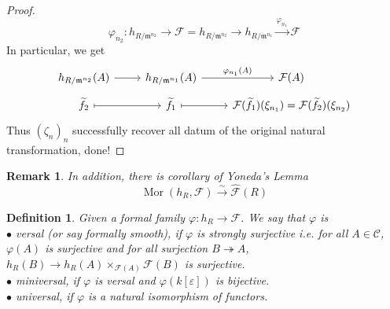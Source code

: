 \documentclass{ctexart}
\newtheorem{definition}{Definition}[section]
\newtheorem{remark}{Remark}[section]
\newcommand{\mor}{\operatorname{Mor}}
\begin{document}
\begin{proof}
    \begin{equation}
        \varphi_{n_{2}}: h_{R/\mathfrak{m}^{n_{2}}} \longrightarrow \mathcal{F} = h_{R/\mathfrak{m}^{n_{2}}} \longrightarrow h_{R/\mathfrak{m}^{n_{1}}} \overset{\varphi_{n_{1}}}{\longrightarrow} \mathcal{F}
    \end{equation} 
    In particular, we get
    \begin{equation}
        \begin{tikzcd}[row sep = tiny]
            h_{R/\mathfrak{m}^{n_{2}}}(A) \arrow[r] &
            h_{R/\mathfrak{m}^{n_{1}}}(A) \arrow[r, "\varphi_{n_{1}}(A)"] &
            \mathcal{F}(A) \\
            \widetilde{f}_{2} \arrow[r, mapsto] &
            \widetilde{f}_{1} \arrow[r, mapsto] &
            \mathcal{F}(\widetilde{f}_{1})(\xi_{n_{1}}) = \mathcal{F}(\widetilde{f}_{2})(\xi_{n_{2}})
        \end{tikzcd}
    \end{equation}
    Thus $(\zeta_{n})_{n}$ successfully recover all datum of the original natural transformation, done!
\end{proof}
\begin{remark}
    In addition, there is corollary of Yoneda's Lemma
    \begin{equation}
        \mor(h_{R}, \mathcal{F}) \overset{\sim}{\longrightarrow} \widehat{\mathcal{F}}(R)
    \end{equation}
\end{remark}
\begin{definition}
    Given a formal family $\varphi: h_{R} \rightarrow \mathcal{F}$.
    We say that $\varphi$ is \\
    $\bullet$ versal (or say formally smooth), if $\varphi$ is strongly surjective i.e. for all $A\in \mathcal{C}$,
    $\varphi(A)$ is surjective and for all surjection $B \twoheadrightarrow A$,
    $h_{R}(B) \rightarrow h_{R}(A) \times_{\mathcal{F}(A)} \mathcal{F}(B)$ is surjective. \\
    $\bullet$ miniversal, if $\varphi$ is versal and $\varphi(k[\varepsilon])$ is bijective. \\
    $\bullet$ universal, if $\varphi$ is a natural isomorphism of functors.
\end{definition}
\end{document}
